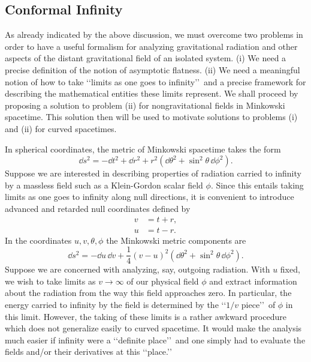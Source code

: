 
\subsection{Conformal Infinity}\label{sec:11.1}

As already indicated by the above discussion, we must overcome two problems in
order to have a useful formalism for analyzing gravitational radiation and other
aspects of the distant gravitational field of an isolated system. (i) We need a precise
definition of the notion of asymptotic flatness. (ii) We need a meaningful notion of
how to take \lq\lq limits as one goes to infinity\rq\rq\ and a precise framework for describing
the mathematical entities these limits represent. We shall proceed by proposing a
solution to problem (ii) for nongravitational fields in Minkowski spacetime. This
solution then will be used to motivate solutions to problems (i) and (ii) for curved
spacetimes.

In spherical coordinates, the metric of Minkowski spacetime takes the form
\begin{equation}
  \dd s^2=-\dd t^2+\dd r^2+r^2(\dd\theta^2+\sin^2\theta\,\dd\phi^2).
  \tag{11.1.1}\label{eq:11.1.1}
\end{equation}
Suppose we are interested in describing properties of radiation carried to infinity by
a massless field such as a Klein-Gordon scalar field \(\phi\). Since this entails taking
limits as one goes to infinity along null directions, it is convenient to introduce
advanced and retarded null coordinates defined by
\begin{align}
  v&=t+r, \tag{11.1.2}\label{eq:11.1.2}\\
  u&=t-r. \tag{11.1.3}\label{eq:11.1.3}
\end{align}
In the coordinates \(u,v,\theta,\phi\) the Minkowski metric components are
\begin{equation}
  \dd s^2=-\dd u\,\dd v+\frac14(v-u)^2(\dd\theta^2+\sin^2\theta\,\dd\phi^2).
  \tag{11.1.4}\label{eq:11.1.4}
\end{equation}
Suppose we are concerned with analyzing, say, outgoing radiation. With \(u\) fixed,
we wish to take limits as \(v\to\infty\) of our physical field \(\phi\) and extract
information about the radiation from the way this field approaches zero. In
particular, the energy carried to infinity by the field is determined by the
\lq\lq \(1/v\) piece\rq\rq\ of \(\phi\) in this limit. However, the taking of these limits is a
rather awkward procedure which does not generalize easily to curved spacetime. It
would make the analysis much easier if infinity were a \lq\lq definite place\rq\rq\ and one
simply had to evaluate the fields and/or their derivatives at this \lq\lq place.\rq\rq

